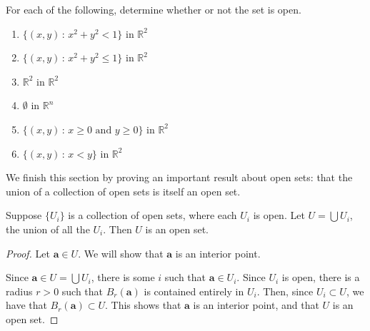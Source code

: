 \documentclass{ximera}
\begin{document}
\begin{problem}

For each of the following, determine whether or not the set is open.

\begin{enumerate}
\item $\{(x,y)\,:\,x^2+y^2<1\}$ in $\mathbb{R}^2$
\begin{multipleChoice}
\end{multipleChoice}			%
\item $\{(x,y)\,:\,x^2+y^2\leq 1\}$ in $\mathbb{R}^2$
\begin{multipleChoice}
\end{multipleChoice}			%
\item $\mathbb{R}^2$ in $\mathbb{R}^2$
\begin{multipleChoice}
\end{multipleChoice}			%
\item $\emptyset$ in $\mathbb{R}^n$
\begin{multipleChoice}
\end{multipleChoice}			%
\item $\{(x,y)\,:\,x\geq 0\textrm{ and }y\geq 0\}$ in $\mathbb{R}^2$
\begin{multipleChoice}
\end{multipleChoice}			%
\item $\{(x,y)\,:\,x<y\}$ in $\mathbb{R}^2$
\begin{multipleChoice}
\end{multipleChoice}			%
\end{enumerate}

\end{problem}

We finish this section by proving an important result about open sets: that the union of a collection of open sets is itself an open set.

\begin{theorem}
Suppose $\{U_i\}$ is a collection of open sets, where each $U_i$ is open. Let $U=\bigcup U_i$, the union of all the $U_i$. Then $U$ is an open set.
\end{theorem}

\begin{proof}
Let $\mathbf{a}\in U$. We will show that $\mathbf{a}$ is an interior point.

Since $\mathbf{a}\in U=\bigcup U_i$, there is some $i$ such that $\mathbf{a}\in U_i$. Since $U_i$ is open, there is a radius $r>0$ such that $B_r(\mathbf{a})$ is contained entirely in $U_i$. Then, since $U_i \subset U$, we have that $B_r(\mathbf{a})\subset U$. This shows that $\mathbf{a}$ is an interior point, and that $U$ is an open set.

\end{proof}
\end{document}
